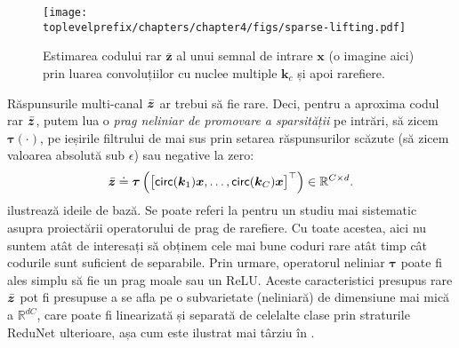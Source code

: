 \documentclass[../../book-main_ro.tex]{subfiles}
\begin{document}
\begin{figure}[t]
	\centerline{
\texttt{[image: \\toplevelprefix/chapters/chapter4/figs/sparse-lifting.pdf]}}
\caption{Estimarea codului rar $\bar{\bm z}$ al unui semnal de intrare $\bm x$ (o imagine aici) prin luarea convoluțiilor cu nuclee multiple $\bm k_c$ și apoi rarefiere.}
		\label{fig:multi-channel-sparse-lifting}
\end{figure}
Răspunsurile multi-canal $\bar {\bm{z}}$ ar trebui să fie rare. Deci, pentru a aproxima codul rar $\bar {\bm{z}}$, putem lua o {\em prag neliniar de promovare a sparsității} pe intrări, să zicem $\bm \tau(\cdot)$, pe ieșirile filtrului de mai sus prin setarea răspunsurilor scăzute (să zicem valoarea absolută sub $\epsilon$) sau negative la zero:
\begin{equation}
\bar {\bm{z}} \doteq \bm \tau \left( \big[\mathsf{circ}(\bm k_1) \bm{x}, \ldots, \mathsf{circ}(\bm k_C) \bm{x} \big]^\top \right) \in \mathbb{R}^{C \times d}.
\label{eqn:sparse-lifting}
\end{equation} 
 ilustrează ideile de bază. Se poate referi la \cite{Analysis-Filter} pentru un studiu mai sistematic asupra proiectării operatorului de prag de rarefiere. Cu toate acestea, aici nu suntem atât de interesați să obținem cele mai bune coduri rare atât timp cât codurile sunt suficient de separabile. Prin urmare, operatorul neliniar $\bm \tau$ poate fi ales simplu să fie un prag moale sau un ReLU. 
Aceste caracteristici presupus rare $\bar {\bm{z}}$ pot fi presupuse a se afla pe o subvarietate (neliniară) de dimensiune mai mică a $\mathbb{R}^{dC}$, care poate fi linearizată și separată de celelalte clase prin straturile ReduNet ulterioare, așa cum este ilustrat mai târziu în . 
\end{document}
